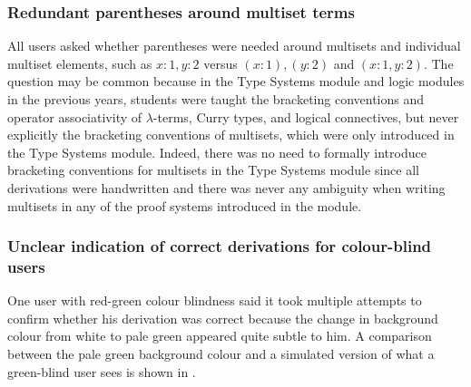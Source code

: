 \subsubsection{Redundant parentheses around multiset terms}
All users asked whether parentheses were needed around multisets and individual multiset elements, such as $x:1, y:2$ versus $(x:1), (y:2)$ and $(x:1, y:2)$. The question may be common because in the Type Systems module and logic modules in the previous years, students were taught the bracketing conventions and operator associativity of $\lambda$-terms, Curry types, and logical connectives, but never explicitly the bracketing conventions of multisets, which were only introduced in the Type Systems module. Indeed, there was no need to formally introduce bracketing conventions for multisets in the Type Systems module since all derivations were handwritten and there was never any ambiguity when writing multisets in any of the proof systems introduced in the module.

\subsubsection{Unclear indication of correct derivations for colour-blind users}
One user with red-green colour blindness said it took multiple attempts to confirm whether his derivation was correct because the change in background colour from white to pale green appeared quite subtle to him. A comparison between the pale green background colour and a simulated version of what a green-blind user sees is shown in .


